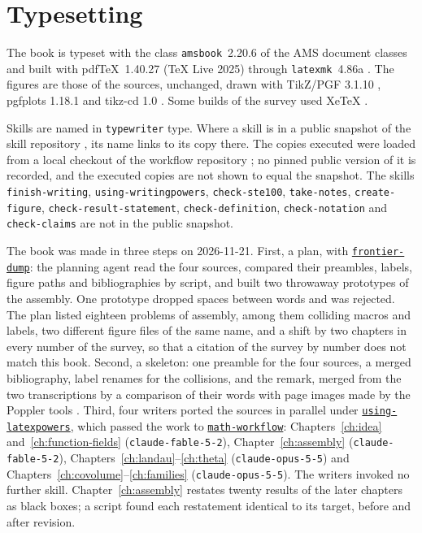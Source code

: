 \documentclass[11pt]{amsbook}
\theoremstyle{plain}
\theoremstyle{definition}
\theoremstyle{remark}
\numberwithin{equation}{section}
\numberwithin{figure}{chapter}
\numberwithin{table}{chapter}
\newcommand{\vtwoskillurl}{https://github.com/tdupu/%
agent-skills-public/blob/8d13efb5e66306aeae6e3b948bc463e7e2db1b65}
\newcommand{\vtwoskill}[1]{%
\href{\vtwoskillurl/skills/#1/SKILL.md}{\texttt{#1}}}
\begin{document}
\section{Typesetting}
\label{sec:ai-typesetting}
The book is typeset with the class \texttt{amsbook}~2.20.6 of the
AMS document classes
\cite[\href{https://ctan.org/pkg/amscls}{CTAN page}]{AMScls} and built
with pdf\TeX{}~1.40.27
\cite[\href{https://ctan.org/pkg/pdftex}{CTAN page}]{pdfTeX} (\TeX{}
Live 2025) through \texttt{latexmk}~4.86a
\cite[\href{https://ctan.org/pkg/latexmk}{CTAN page}]{Latexmk}. The
figures are those of the sources, unchanged, drawn with TikZ/PGF
3.1.10 \cite[\href{https://ctan.org/pkg/pgf}{CTAN page}]{Tantau2023pgf},
pgfplots 1.18.1
\cite[\href{https://ctan.org/pkg/pgfplots}{CTAN page}]%
{Feuersanger2021pgfplots} and tikz-cd 1.0
\cite[\href{https://ctan.org/pkg/tikz-cd}{CTAN page}]{Stoffel2021tikzcd}.
Some builds of the survey used Xe\TeX{}
\cite[\href{https://tug.org/xetex/}{home page}]{XeTeX}.

Skills are named in \texttt{typewriter} type. Where a skill is in a
public snapshot of the skill repository \cite[\href{\vtwoskillurl/%
README.md}{README}]{Dupuy2026agentskills}, its name links to its copy
there. The copies executed were loaded from a local checkout of the
workflow repository \cite[\href{https://github.com/tdupu/mathcity}%
{repository}]{Dupuy2026mathcity}; no pinned public version of it is
recorded, and the executed copies are not shown to equal the snapshot.
The skills \texttt{finish-writing}, \texttt{using-writingpowers},
\texttt{check-ste100}, \texttt{take-notes}, \texttt{create-figure},
\texttt{check-result-statement}, \texttt{check-definition},
\texttt{check-notation} and \texttt{check-claims} are not in the public
snapshot.

The book was made in three steps on 2026-11-21. First, a plan, with
\vtwoskill{frontier-dump}: the planning agent read the four sources,
compared their preambles, labels, figure paths and bibliographies by
script, and built two throwaway prototypes of the assembly. One
prototype dropped spaces between words and was rejected. The plan
listed eighteen problems of assembly, among them colliding macros and
labels, two different figure files of the same name, and a shift by
two chapters in every number of the survey, so that a citation of the
survey by number does not match this book. Second, a skeleton:
one preamble for the four sources, a merged bibliography, label
renames for the collisions, and the remark, merged from the two
transcriptions by a comparison of their words with page images made by
the Poppler tools
\cite[\href{https://poppler.freedesktop.org/}{home page}]{Poppler}.
Third, four writers ported the sources in parallel under
\vtwoskill{using-latexpowers}, which passed the work to
\vtwoskill{math-workflow}: Chapters~\ref{ch:idea}
and~\ref{ch:function-fields} (\texttt{claude-fable-5-2}),
Chapter~\ref{ch:assembly} (\texttt{claude-fable-5-2}),
Chapters~\ref{ch:landau}--\ref{ch:theta} (\texttt{claude-opus-5-5}) and
Chapters~\ref{ch:covolume}--\ref{ch:families}
(\texttt{claude-opus-5-5}). The writers invoked no further skill.
Chapter~\ref{ch:assembly} restates twenty results of the later
chapters as black boxes; a script found each restatement identical to
its target, before and after revision.
\end{document}
